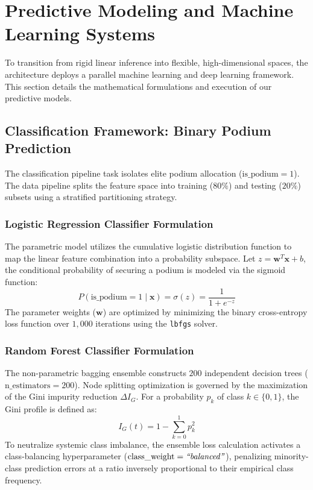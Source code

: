 \section{Predictive Modeling and Machine Learning Systems}
\label{sec:predictive_ml}

To transition from rigid linear inference into flexible, high-dimensional spaces, the architecture deploys a parallel machine learning and deep learning framework. This section details the mathematical formulations and execution of our predictive models.

\subsection{Classification Framework: Binary Podium Prediction}
\label{subsec:classification_podium}

The classification pipeline task isolates elite podium allocation ($\text{is\_podium} = 1$). The data pipeline splits the feature space into training ($80\%$) and testing ($20\%$) subsets using a stratified partitioning strategy.

\subsubsection{Logistic Regression Classifier Formulation}
The parametric model utilizes the cumulative logistic distribution function to map the linear feature combination into a probability subspace. Let $z = \mathbf{w}^T \mathbf{x} + b$, the conditional probability of securing a podium is modeled via the sigmoid function:
\begin{equation}
P(\text{is\_podium} = 1 \mid \mathbf{x}) = \sigma(z) = \frac{1}{1 + e^{-z}}
\end{equation}
The parameter weights ($\mathbf{w}$) are optimized by minimizing the binary cross-entropy loss function over $1,000$ iterations using the \texttt{lbfgs} solver.

\subsubsection{Random Forest Classifier Formulation}
The non-parametric bagging ensemble constructs $200$ independent decision trees ($\text{n\_estimators} = 200$). Node splitting optimization is governed by the maximization of the Gini impurity reduction $\Delta I_G$. For a probability $p_k$ of class $k \in \{0,1\}$, the Gini profile is defined as:
\begin{equation}
I_G(t) = 1 - \sum_{k=0}^{1} p_k^2
\end{equation}
To neutralize systemic class imbalance, the ensemble loss calculation activates a class-balancing hyperparameter ($\text{class\_weight} = \text{\textit{``balanced''}}$), penalizing minority-class prediction errors at a ratio inversely proportional to their empirical class frequency.

